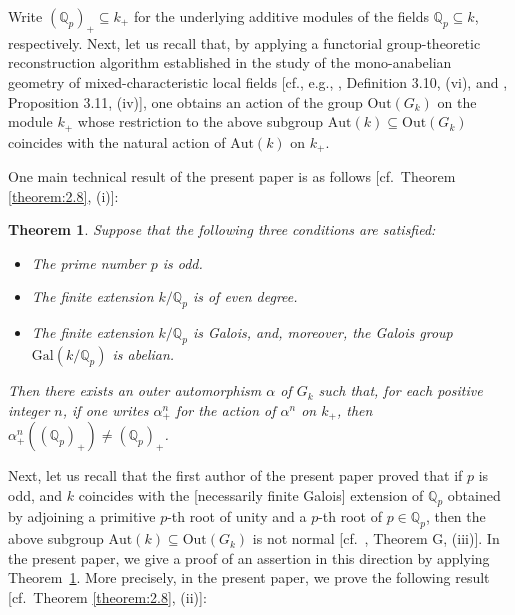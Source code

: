 \documentclass[11pt,showkeys]{article}
\theoremstyle{theorem}
\newtheorem{introtheorem}{Theorem}
\theoremstyle{definition}
\begin{document}
Write $(\mathbb{Q}_p)_+ \subseteq k_+$ for the underlying 
additive modules of the fields $\mathbb{Q}_p \subseteq k$, 
respectively.  Next, let us recall that, by applying a 
functorial group-theoretic reconstruction algorithm 
established in the study of the mono-anabelian geometry of mixed-characteristic local fields [cf., 
e.g., \cite{Hoshi1}, Definition 3.10, (vi), and \cite{Hoshi1}, 
Proposition 3.11, (iv)], one obtains an action of the group 
$\mathrm{Out}(G_k)$ on the module $k_+$ whose restriction 
to the above subgroup $\mathrm{Aut}(k) \subseteq 
\mathrm{Out}(G_k)$ coincides with the natural action of 
$\mathrm{Aut}(k)$ on $k_+$.  


One main technical result of the present paper is as 
follows [cf.\ Theorem \ref{theorem:2.8}, (i)]:

\begin{introtheorem}
\label{AAAAAAA}
Suppose that the following three conditions are 
satisfied:  
\begin{itemize}
\item[$(1)$]
The prime number $p$ is odd.  
\item[$(2)$]
The finite extension $k / \mathbb{Q}_p$ is 
of even degree.  
\item[$(3)$]
The finite extension $k / \mathbb{Q}_p$ is Galois, 
and, moreover, the Galois group 
$\mathrm{Gal}(k / \mathbb{Q}_p)$ is abelian.  
\end{itemize}
Then there exists an outer automorphism $\alpha$ of $G_k$ 
such that, for each positive integer $n$, if one writes 
$\alpha_+^n$ for the action of $\alpha^n$ on $k_+$, then 
$\alpha^n_+((\mathbb{Q}_p)_+) \neq (\mathbb{Q}_p)_+$.  
\end{introtheorem}
\begin{comment}
key phrase:

anabelian geometry, 
mono-anabelian geometry, 
mono-anabelian reconstruction algorithm, 
MLF, group of MLF-type, 
log-shell, 
absolutely abelian MLF, 
Galoisspecifiable MLF.
local fields, 
\end{comment}

Next, let us recall that the first author of the 
present paper proved that if $p$ is odd, and $k$ 
coincides with the [necessarily finite Galois] 
extension of $\mathbb{Q}_p$ obtained by adjoining 
a primitive $p$-th root of unity and a $p$-th root 
of $p \in \mathbb{Q}_p$, then the above subgroup 
$\mathrm{Aut}(k) \subseteq \mathrm{Out}(G_k)$ is 
not normal [cf.\ \cite{Hoshi2}, Theorem G, (iii)].  
In the present paper, we give a proof of an assertion 
in this direction by applying Theorem~\ref{AAAAAAA}.  
More precisely, in the present paper, we prove the 
following result [cf.\ Theorem \ref{theorem:2.8}, 
(ii)]:  
\end{document}
